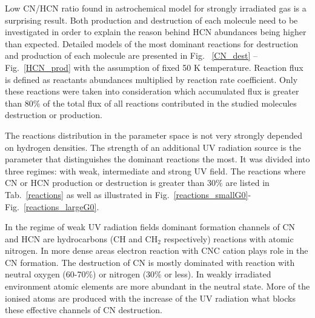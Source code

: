 \documentclass{aa}
\begin{document}

Low CN/HCN ratio found in astrochemical model for strongly irradiated gas is a surprising result.
Both production and destruction of each molecule need to be investigated in order to explain the
reason behind HCN abundances being higher than expected. Detailed models of the most dominant
reactions for destruction and production of each molecule are presented in Fig. ~\ref{CN_dest} –
Fig.~\ref{HCN_prod} with the assumption of fixed 50 K temperature. Reaction flux is defined as
reactants abundances multiplied by reaction rate coefficient. Only these reactions were taken into
consideration which accumulated flux is greater than 80$\%$ of the total flux of all reactions
contributed in the studied molecules destruction or production.

The reactions distribution in the parameter space is not very strongly depended on hydrogen
densities. The strength of an additional UV radiation source is the parameter that distinguishes the
dominant reactions the most. It was divided into three regimes: with weak, intermediate and strong
UV field. The reactions where CN or HCN production or destruction is greater than 30$\%$ are listed
in Tab.~\ref{reactions} as well as illustrated in Fig.~\ref{reactions_smallG0}-
Fig.~\ref{reactions_largeG0}.

In the regime of weak UV radiation fields dominant formation channels of CN and HCN are hydrocarbons
(CH and CH$_2$ respectively) reactions with atomic nitrogen. In more dense areas electron reaction
with CNC cation plays role in the CN formation. The destruction of CN is mostly dominated with
reaction with neutral oxygen (60-70$\%$) or nitrogen (30$\%$ or less). In weakly irradiated
environment atomic elements are more abundant in the neutral state. More of the ionised atoms are
produced with the increase of the UV radiation what blocks these effective channels of CN
destruction.
\end{document}
